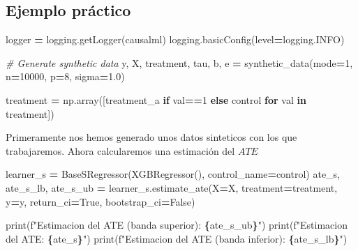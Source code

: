 \documentclass[
  a4paper,
  DIV=11,
  numbers=noendperiod]{scrreprt}
\newenvironment{Shaded}{\begin{snugshade}}{\end{snugshade}}
\newcommand{\BuiltInTok}[1]{#1}
\newcommand{\CommentTok}[1]{\textcolor[rgb]{0.56,0.35,0.01}{\textit{#1}}}
\newcommand{\ControlFlowTok}[1]{\textcolor[rgb]{0.13,0.29,0.53}{\textbf{#1}}}
\newcommand{\DecValTok}[1]{\textcolor[rgb]{0.00,0.00,0.81}{#1}}
\newcommand{\FloatTok}[1]{\textcolor[rgb]{0.00,0.00,0.81}{#1}}
\newcommand{\KeywordTok}[1]{\textcolor[rgb]{0.13,0.29,0.53}{\textbf{#1}}}
\newcommand{\NormalTok}[1]{#1}
\newcommand{\OperatorTok}[1]{\textcolor[rgb]{0.81,0.36,0.00}{\textbf{#1}}}
\newcommand{\SpecialCharTok}[1]{\textcolor[rgb]{0.81,0.36,0.00}{\textbf{#1}}}
\newcommand{\SpecialStringTok}[1]{\textcolor[rgb]{0.31,0.60,0.02}{#1}}
\newcommand{\StringTok}[1]{\textcolor[rgb]{0.31,0.60,0.02}{#1}}
\newcommand{\VariableTok}[1]{\textcolor[rgb]{0.00,0.00,0.00}{#1}}
\begin{document}
\subsection{Ejemplo práctico}\label{ejemplo-pruxe1ctico}

\begin{Shaded}
\begin{Highlighting}[numbers=left,,]
\NormalTok{logger }\OperatorTok{=}\NormalTok{ logging.getLogger(}\StringTok{\textquotesingle{}causalml\textquotesingle{}}\NormalTok{)}
\NormalTok{logging.basicConfig(level}\OperatorTok{=}\NormalTok{logging.INFO)}

\CommentTok{\# Generate synthetic data}
\NormalTok{y, X, treatment, tau, b, e }\OperatorTok{=}\NormalTok{ synthetic\_data(mode}\OperatorTok{=}\DecValTok{1}\NormalTok{, n}\OperatorTok{=}\DecValTok{10000}\NormalTok{, p}\OperatorTok{=}\DecValTok{8}\NormalTok{, sigma}\OperatorTok{=}\FloatTok{1.0}\NormalTok{)}

\NormalTok{treatment }\OperatorTok{=}\NormalTok{ np.array([}\StringTok{\textquotesingle{}treatment\_a\textquotesingle{}} \ControlFlowTok{if}\NormalTok{ val}\OperatorTok{==}\DecValTok{1} \ControlFlowTok{else} \StringTok{\textquotesingle{}control\textquotesingle{}} \ControlFlowTok{for}\NormalTok{ val }\KeywordTok{in}\NormalTok{ treatment])}
\end{Highlighting}
\end{Shaded}

Primeramente nos hemos generado unos datos sinteticos con los que
trabajaremos. Ahora calcularemos una estimación del \(ATE\)

\begin{Shaded}
\begin{Highlighting}[numbers=left,,]
\NormalTok{learner\_s }\OperatorTok{=}\NormalTok{ BaseSRegressor(XGBRegressor(), control\_name}\OperatorTok{=}\StringTok{\textquotesingle{}control\textquotesingle{}}\NormalTok{)}
\NormalTok{ate\_s, ate\_s\_lb, ate\_s\_ub }\OperatorTok{=}\NormalTok{ learner\_s.estimate\_ate(X}\OperatorTok{=}\NormalTok{X, treatment}\OperatorTok{=}\NormalTok{treatment, y}\OperatorTok{=}\NormalTok{y, return\_ci}\OperatorTok{=}\VariableTok{True}\NormalTok{, bootstrap\_ci}\OperatorTok{=}\VariableTok{False}\NormalTok{)}

\BuiltInTok{print}\NormalTok{(}\SpecialStringTok{f"Estimacion del ATE (banda superior): }\SpecialCharTok{\{}\NormalTok{ate\_s\_ub}\SpecialCharTok{\}}\SpecialStringTok{"}\NormalTok{)}
\BuiltInTok{print}\NormalTok{(}\SpecialStringTok{f"Estimacion del ATE: }\SpecialCharTok{\{}\NormalTok{ate\_s}\SpecialCharTok{\}}\SpecialStringTok{"}\NormalTok{)}
\BuiltInTok{print}\NormalTok{(}\SpecialStringTok{f"Estimacion del ATE (banda inferior): }\SpecialCharTok{\{}\NormalTok{ate\_s\_lb}\SpecialCharTok{\}}\SpecialStringTok{"}\NormalTok{)}
\end{Highlighting}
\end{Shaded}
\end{document}
